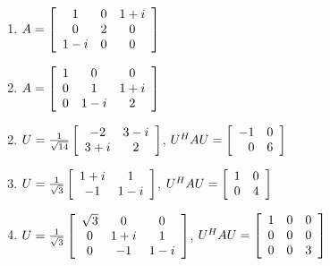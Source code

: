 \begin{multicols}{2}
\begin{ex}
\begin{enumerate}[label={\alph*.}]
\item $A = \left[ \begin{array}{ccc}
1 & 0 &  1 + i\\
0 & 2 & 0 \\
1 - i & 0 & 0
\end{array}\right]$

\item $A = \left[ \begin{array}{ccc}
1 & 0 & 0\\
0 & 1 & 1 + i\\
0 & 1 - i & 2
\end{array}\right]$

\end{enumerate}
\begin{sol}
\begin{enumerate}[label={\alph*.}]
\setcounter{enumi}{1}
\item  $U = \tfrac{1}{\sqrt{14}}\left[ \begin{array}{cc}
-2 & 3 - i \\
3 + i & 2
\end{array}\right]$, $U^HAU = \left[ \begin{array}{rr}
-1 & 0 \\
0 & 6
\end{array}\right]$

\setcounter{enumi}{3}
\item  $U = \tfrac{1}{\sqrt{3}}\left[ \begin{array}{cc}
1 + i & 1 \\
-1 & 1 - i
\end{array}\right]$, $U^HAU = \left[ \begin{array}{rr}
1 & 0 \\
0 & 4
\end{array}\right]$

\setcounter{enumi}{5}
\item  $U = \tfrac{1}{\sqrt{3}}\left[ \begin{array}{ccc}
\sqrt{3} & 0 & 0 \\
0 & 1 + i & 1 \\
0 & -1 & 1 - i
\end{array}\right]$, $U^HAU = \left[ \begin{array}{rrr}
1 & 0 & 0 \\
0 & 0 & 0 \\
0 & 0 & 3
\end{array}\right]$

\end{enumerate}
\end{sol}
\end{ex}


\end{multicols}
